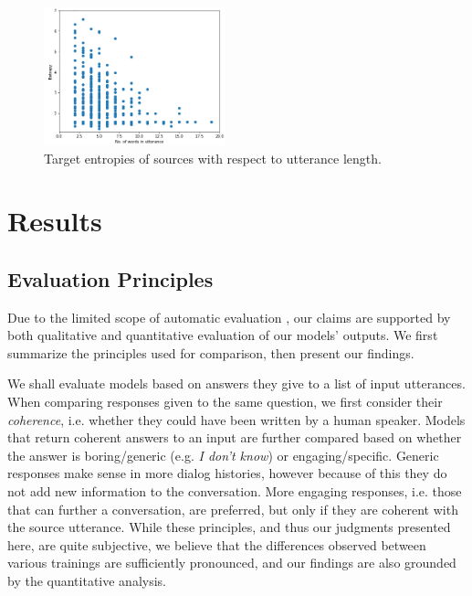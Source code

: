 \documentclass[11pt,a4paper]{article}
\begin{document}
\begin{figure}[!ht]
	\centering
	\includegraphics[width=0.47\textwidth]{pics/source_entropies_length.png}
	\caption{Target entropies of sources with respect to utterance length.}
	\label{fig:length}
\end{figure}

\section{Results}
\label{sec:results}
\subsection{Evaluation Principles}
\label{sec:eval}

Due to the limited scope of automatic evaluation
\cite{Liu:2016}, our claims are supported by both qualitative and quantitative evaluation of our models' outputs. We first summarize the principles used for
comparison, then present our findings.

We shall evaluate models based on answers they give to a list of input utterances.
When comparing responses given to the same question, we first consider
their \textit{coherence}, i.e. whether they could have been written by a
human speaker. Models that return coherent answers to an input
are further compared based on whether the answer is boring/generic (e.g.
\textit{I don't know}) or engaging/specific. 
Generic responses make sense in more dialog histories, however because of this
they do not add new information to the
conversation. More engaging responses, i.e. those that can further a conversation,
are preferred, but only if they are coherent with the source utterance.
While these principles, and thus our judgments presented here, are quite subjective,
we believe that the differences observed between various trainings
are sufficiently pronounced, and our findings are also grounded by the quantitative analysis.
\end{document}

